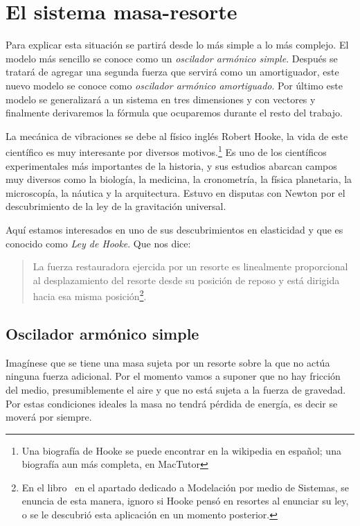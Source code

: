 \section{El sistema masa-resorte}

Para explicar esta situación se partirá desde lo más simple a lo más complejo. El modelo más sencillo se conoce como un \emph{oscilador armónico simple}. Después se tratará de agregar una segunda fuerza que servirá como un amortiguador, este nuevo modelo se conoce como \emph{oscilador armónico amortiguado}. Por último este modelo se generalizará a un sistema en tres dimensiones y con vectores y finalmente derivaremos la fórmula que ocuparemos durante el resto del trabajo. 

La mecánica de vibraciones se debe al físico inglés Robert Hooke, la vida de este científico es muy interesante por diversos motivos.\footnote{Una biografía de Hooke se puede encontrar en la wikipedia en español; una biografía aun más completa, en MacTutor} Es uno de los científicos experimentales más importantes de la historia,  y sus estudios abarcan campos muy diversos como la biología, la medicina, la cronometría, la física planetaria, la microscopía, la náutica y la arquitectura. Estuvo en disputas con Newton por el descubrimiento de la ley de la gravitación universal.

Aquí estamos interesados en uno de sus descubrimientos en elasticidad y que es conocido como \emph{Ley de Hooke}. Que nos dice: 
\begin{quote}
La fuerza restauradora ejercida por un resorte es linealmente proporcional al desplazamiento del resorte desde su posición de reposo y está dirigida hacia esa misma posición\footnote{En el libro~\cite{Blanchard:Ecuaciones} en el apartado dedicado a Modelación por medio de Sistemas, se enuncia de esta manera, ignoro si Hooke pensó en resortes al enunciar su ley, o se le descubrió esta aplicación en un momento posterior.}.
\end{quote}

\subsection{Oscilador armónico simple}
Imagínese que se tiene una masa sujeta por un resorte sobre la que no actúa ninguna fuerza adicional. Por el momento vamos a suponer que no hay fricción del medio, presumiblemente el aire y que no está sujeta a la fuerza de gravedad. Por estas condiciones ideales la masa no tendrá pérdida de energía, es decir se moverá por siempre.

